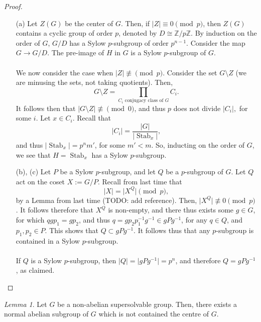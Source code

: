 \documentclass[a4paper]{report}
\theoremstyle{definition}
\theoremstyle{remark}
\theoremstyle{proposition}
\theoremstyle{conjecture}
\theoremstyle{lemma}
\newtheorem{lemma}{Lemma}
\theoremstyle{corollary}
\theoremstyle{exercise}
\theoremstyle{example}
\newcommand{\on}{\operatorname}
\begin{document}
\begin{proof}
    \leavevmode
    \begin{itemize}
        \item[(a)] Let $Z(G)$ be the center of $G$. Then, if 
            $\vert Z\vert\equiv 0\pmod{p}$, then $Z(G)$ contains a cyclic
            group of order $p$, denoted by $D\cong \mathbb{Z}/p\mathbb{Z}$. 
            By induction on the order of $G$, $G/D$ has a Sylow $p$-subgroup of 
            order $p^{n-1}$.
            Consider the map $G \to G/D$. The pre-image of $H$ in $G$ is a
            Sylow $p$-subgroup of $G$.\\\\
            We now consider the case when $\vert Z \vert \not\equiv \pmod{p}$.
            Consider the set $G\setminus Z$ (we are minusing the 
            sets, not taking quotients). Then,
            $$G\setminus Z = \prod_{\text{$C_i$ conjugacy class of $G$}}C_i.$$
            It follows then that $\vert G \setminus Z \vert\not\equiv\pmod{0}$,
            and thus $p$ does not divide $\vert C_i\vert,$ for some $i$.
            Let $x\in C_i$. Recall that 
            $$\vert C_i\vert = \frac{\vert G\vert}{\vert\on{Stab}_x\vert},$$
            and thus $\vert \on{Stab}_x\vert = p^nm'$, 
            for some $m'<m$. So, inducting on the order of $G$, we see that 
            $H= \on{Stab}_x$ has a Sylow $p$-subgroup.
        \item[(b), (c)] Let $P$ be a Sylow $p$-subgroup, and let $Q$ be a 
            $p$-subgroup of $G$. Let $Q$ act on the coset $X:=G/P$. Recall 
            from last time that 
            $$\vert X\vert = \vert X^Q\vert \pmod{p},$$
            by a Lemma from last time (TODO: add reference).
            Then, $\vert X^Q\vert \not\equiv 0\pmod{p}$. It follows therefore
            that $X^Q$ is non-empty, and there thus exists some 
            $g\in G$, for which $qgp_1 = gp_2$, and thus
            $q=gp_2p_1^{-1}g^{-1} \in gPg^{-1}$, for any $q\in Q$, and
            $p_1,p_2\in P$.
            This shows that $Q\subset gPg^{-1}$. It follows thus that
            any $p$-subgroup is contained in a Sylow $p$-subgroup.\\\\
            If $Q$ is a Sylow $p$-subgroup, then 
            $\vert Q \vert = \vert gPg^{-1}\vert = p^n$, and therefore 
            $Q = gPg^{-1}$, as claimed.
    \end{itemize}
\end{proof}

\begin{lemma}\label{lem_supsolv}
    Let $G$ be a non-abelian supersolvable group. Then, there exists a
    normal abelian subgroup of $G$ which is not contained the centre of 
    $G$.
\end{lemma}
\end{document}
